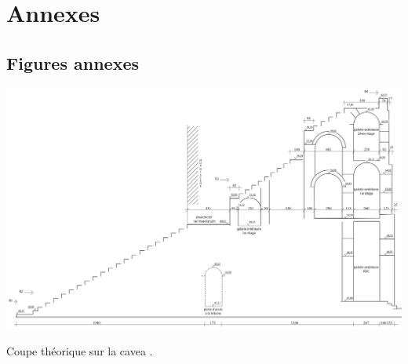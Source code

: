 

\chapter{Annexes} \label{Annexes}



\section*{Figures annexes}

\begin{figureth}
	\includegraphics[width=\linewidth]{images/CoupeCavea}
	\caption[Coupe théorique sur la \gls{cavea}.]{Coupe théorique sur la \gls{cavea} \footnotemark.} 
	\label{coupeCavea} 
\end{figureth}


